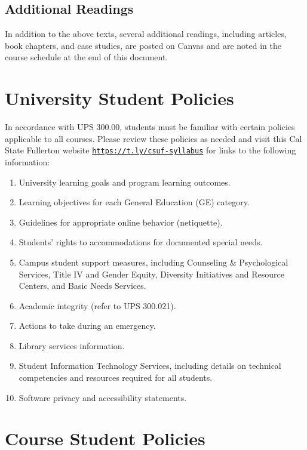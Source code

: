 \documentclass[12pt, letterpaper]{article}
\begin{document}
\subsection*{Additional Readings}

In addition to the above texts, several additional readings, including articles, book chapters, and case studies, are posted on Canvas and are noted in the course schedule at the end of this document. 


\section*{University Student Policies}

In accordance with UPS 300.00, students must be familiar with certain policies applicable to all courses. Please review these policies as needed and visit this Cal State Fullerton website \href{https://t.ly/csuf-syllabus}{\texttt{https://t.ly/csuf-syllabus}} for links to the following information:

\begin{enumerate}
    \item   University learning goals and program learning outcomes.
    \item	Learning objectives for each General Education (GE) category.
    \item	Guidelines for appropriate online behavior (netiquette).
    \item	Students’ rights to accommodations for documented special needs.
    \item   Campus student support measures, including Counseling \& Psychological Services, Title IV and Gender Equity, Diversity Initiatives and Resource Centers, and Basic Needs Services.
    \item	Academic integrity (refer to UPS 300.021).
    \item	Actions to take during an emergency.
    \item	Library services information.
    \item	Student Information Technology Services, including details on technical competencies and resources required for all students.
    \item	Software privacy and accessibility statements.
\end{enumerate}

\section*{Course Student Policies}
\end{document}
